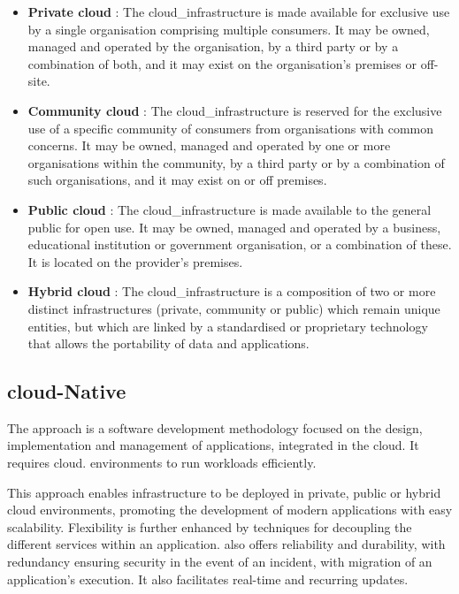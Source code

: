 \begin{itemize}
    \item \textbf{Private \gls{cloud}} : The \gls{cloud_infrastructure} is made available for exclusive use by a single organisation comprising multiple consumers. It may be owned, managed and operated by the organisation, by a third party or by a combination of both, and it may exist on the organisation's premises or off-site.
    \item \textbf{Community \gls{cloud}} : The \gls{cloud_infrastructure} is reserved for the exclusive use of a specific community of consumers from organisations with common concerns. It may be owned, managed and operated by one or more organisations within the community, by a third party or by a combination of such organisations, and it may exist on or off premises.
    \item \textbf{Public \gls{cloud}} : The \gls{cloud_infrastructure} is made available to the general public for open use. It may be owned, managed and operated by a business, educational institution or government organisation, or a combination of these. It is located on the provider's premises.
    \item \textbf{Hybrid \gls{cloud}} : The \gls{cloud_infrastructure} is a composition of two or more distinct infrastructures (private, community or public) which remain unique entities, but which are linked by a standardised or proprietary technology that allows the portability of data and applications.
\end{itemize}

\subsection{\Gls{cloud}-Native}
\label{subsec:cloudnative}
The  approach is a software development methodology focused on the design, implementation and management of applications, integrated in the \gls{cloud}. It requires \gls{cloud}.  environments to run workloads efficiently.

This approach enables infrastructure to be deployed in private, public or hybrid \gls{cloud} environments, promoting the development of modern applications with easy scalability. Flexibility is further enhanced by techniques for decoupling the different services within an application.  also offers reliability and durability, with redundancy ensuring security in the event of an incident, with migration of an application's execution. It also facilitates real-time and recurring updates.

